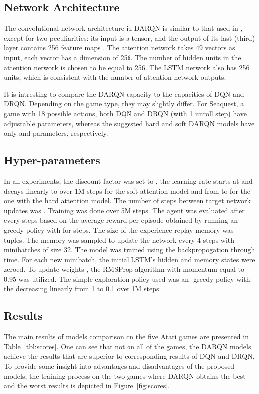 \documentclass{article} \usepackage{nips15submit_e,times}
\begin{document}
\subsection{Network Architecture}

The convolutional network architecture in DARQN is similar to that used in \cite{mnih2015human}, except for two peculiarities: 
its input is a  tensor, and the output of its last (third) layer contains 256 feature maps . The attention network takes 49 vectors as input, each vector has a dimension of 256. The number of hidden units in the attention network is chosen to be equal to 256. The LSTM network also has 256 units, which is consistent with the number of attention network outputs.

It is intresting to compare the DARQN capacity to the capacities of DQN and DRQN. Depending on the game type, they may slightly differ. For Seaquest, a game with 18 possible actions, both DQN and DRQN (with 1 unroll step) have  adjustable parameters, whereas the suggested hard and soft DARQN models have only  and  parameters, respectively.

\subsection{Hyper-parameters}

In all experiments, the discount factor was set to , the learning rate  starts at  and decays linearly to  over 1M steps for the soft attention model and from  to  for the one with the hard attention model. The number of steps between target network updates was . Training was done over 5M steps. The agent was evaluated after every  steps based on the average reward per episode obtained by running an -greedy policy with  for  steps. The size of the experience replay memory was  tuples. The memory was sampled to update the network every 4 steps with minibatches of size 32. The model was trained using the backpropogation through time. For each new minibatch, the initial LSTM's hidden and memory states were zeroed. To update weights , the RMSProp algorithm with momentum equal to 0.95 was utilized. The simple exploration policy used was an -greedy policy with the  decreasing linearly from 1 to 0.1 over 1M steps.

\subsection{Results}

The main results of models comparison on the five Atari games are presented in Table~\ref{tbl:scores}. One can see that not on all of the games, the DARQN models achieve the results that are superior to corresponding results of DQN and DRQN. To provide some insight into advantages and disadvantages of the proposed models, the training process on the two games where DARQN obtains the best and the worst results is depicted in Figure~\ref{fig:scores}. 
\end{document}
